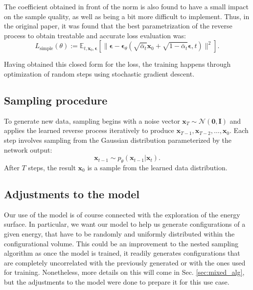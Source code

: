 \documentclass[a4paper, 12pt]{article}          %
\begin{document}
The coefficient obtained in front of the norm is also found to have a small impact on the sample quality, as well as being a bit more difficult to implement. Thus, in the original paper, it was found that the best parametrization of the reverse process to obtain treatable and accurate loss evaluation was:
\begin{equation}
    L_{\mathrm{simple}}(\theta) := \mathbb{E}_{t,\mathbf{x}_0,\boldsymbol{\epsilon}} \left[ \| \boldsymbol{\epsilon} - \boldsymbol{\epsilon}_\theta \left(\sqrt{\bar{\alpha}_t}\mathbf{x}_0 + \sqrt{1-\bar{\alpha}_t} \boldsymbol{\epsilon},t\right) \|^2 \right].
\end{equation}

Having obtained this closed form for the loss, the training happens through optimization of random steps using stochastic gradient descent.

\subsection{Sampling procedure}

To generate new data, sampling begins with a noise vector $\mathbf{x}_T \sim \mathcal{N}(\mathbf{0}, \mathbf{I})$ and applies the learned reverse process iteratively to produce $\mathbf{x}_{T-1}, \mathbf{x}_{T-2}, \ldots, \mathbf{x}_0$. Each step involves sampling from the Gaussian distribution parameterized by the network output:
\begin{equation}
    \mathbf{x}_{t-1} \sim p_\theta(\mathbf{x}_{t-1} | \mathbf{x}_t).
\end{equation}
After $T$ steps, the result $\mathbf{x}_0$ is a sample from the learned data distribution. 

\subsection{Adjustments to the model}
Our use of the model is of course connected with the exploration of the energy surface. In particular, we want our model to help us generate configurations of a given energy, that have to be randomly and uniformly distributed within the configurational volume. This could be an improvement to the nested sampling algorithm as once the model is trained, it readily generates configurations that are completely uncorrelated with the previously generated or with the ones used for training. Nonetheless, more details on this will come in Sec. \ref{sec:mixed_alg}, but the adjustments to the model were done to prepare it for this use case.
\end{document}

